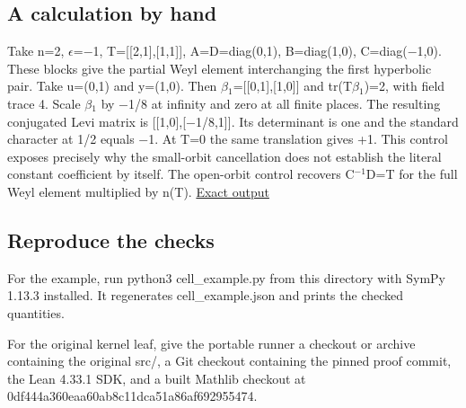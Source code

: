 \documentclass[11pt,letterpaper]{article}
\begin{document}
\subsection{A calculation by hand}
Take n=2, \ensuremath{\epsilon}=\ensuremath{-}1, T=[[2,1],[1,1]], A=D=diag(0,1), B=diag(1,0), C=diag(\ensuremath{-}1,0). These blocks give the partial Weyl element interchanging the first hyperbolic pair. Take u=(0,1) and y=(1,0). Then \ensuremath{\beta}\ensuremath{{}_{1}}=[[0,1],[1,0]] and tr(T\ensuremath{\beta}\ensuremath{{}_{1}})=2, with field trace 4. Scale \ensuremath{\beta}\ensuremath{{}_{1}} by \ensuremath{-}1/8 at infinity and zero at all finite places. The resulting conjugated Levi matrix is [[1,0],[\ensuremath{-}1/8,1]]. Its determinant is one and the standard character at 1/2 equals \ensuremath{-}1. At T=0 the same translation gives +1. This control exposes precisely why the small-orbit cancellation does not establish the literal constant coefficient by itself. The open-orbit control recovers C\ensuremath{{}^{-1}}D=T for the full Weyl element multiplied by n(T). \href{https://github.com/nousentllc/riemann-hypothesis/blob/2c03d15e908bcbe4aae3c94a87c7ada402cd7911/research/uriel/experiments/siegel-weil-constant-term/orbit-cell/cell_example.json}{Exact output}

\subsection{Reproduce the checks}
For the example, run {\ttfamily\small python3 cell\_\allowbreak{}example.\allowbreak{}py} from this directory with SymPy 1.13.3 installed. It regenerates {\ttfamily\small cell\_\allowbreak{}example.\allowbreak{}json} and prints the checked quantities.

For the original kernel leaf, give the portable runner a checkout or archive containing the original {\ttfamily\small src/\allowbreak{}}, a Git checkout containing the pinned proof commit, the Lean 4.33.1 SDK, and a built Mathlib checkout at {\ttfamily\small 0df444a360eaa6\allowbreak{}0ab8c11dca51a8\allowbreak{}6af692955474}.
\end{document}
